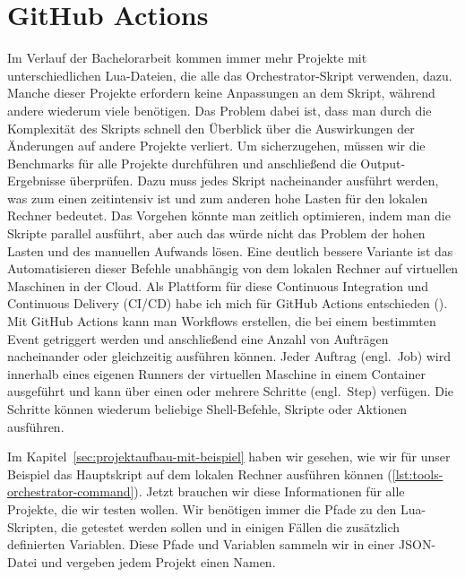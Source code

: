 \section{GitHub Actions}\label{sec:github-actions}

Im Verlauf der Bachelorarbeit kommen immer mehr Projekte mit unterschiedlichen Lua-Dateien, die alle das Orchestrator-Skript verwenden, dazu.
Manche dieser Projekte erfordern keine Anpassungen an dem Skript, während andere wiederum viele benötigen.
Das Problem dabei ist, dass man durch die Komplexität des Skripts schnell den Überblick über die Auswirkungen der Änderungen auf andere Projekte verliert.
Um sicherzugehen, müssen wir die Benchmarks für alle Projekte durchführen und anschließend die Output-Ergebnisse überprüfen.
Dazu muss jedes Skript nacheinander ausführt werden, was zum einen zeitintensiv ist und zum anderen hohe Lasten für den lokalen Rechner bedeutet.
Das Vorgehen könnte man zeitlich optimieren, indem man die Skripte parallel ausführt, aber auch das würde nicht das Problem der hohen Lasten und des manuellen Aufwands lösen.
Eine deutlich bessere Variante ist das Automatisieren dieser Befehle unabhängig von dem lokalen Rechner auf virtuellen Maschinen in der Cloud.
Als Plattform für diese Continuous Integration und Continuous Delivery (CI/CD) habe ich mich für GitHub Actions entschieden (\cite{github_action_doku}).
Mit GitHub Actions kann man Workflows erstellen, die bei einem bestimmten Event getriggert werden und anschließend eine Anzahl von Aufträgen nacheinander oder gleichzeitig ausführen können.
Jeder Auftrag (engl.\ Job) wird innerhalb eines eigenen Runners der virtuellen Maschine in einem Container ausgeführt und kann über einen oder mehrere Schritte (engl.\ Step) verfügen.
Die Schritte können wiederum beliebige Shell-Befehle, Skripte oder Aktionen ausführen.

Im Kapitel~\ref{sec:projektaufbau-mit-beispiel} haben wir gesehen, wie wir für unser Beispiel das Hauptskript auf dem lokalen Rechner ausführen können (\ref{lst:tools-orchestrator-command}).
Jetzt brauchen wir diese Informationen für alle Projekte, die wir testen wollen.
Wir benötigen immer die Pfade zu den Lua-Skripten, die getestet werden sollen und in einigen Fällen die zusätzlich definierten Variablen.
Diese Pfade und Variablen sammeln wir in einer JSON-Datei und vergeben jedem Projekt einen Namen.

\vspace{-8pt}

\vspace{-5pt}

